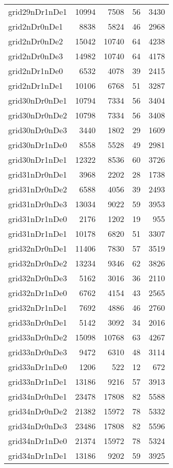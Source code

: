 \begin{longtable}{lrrrr}
grid29nDr1nDe1 & 10994 & 7508 & 56 & 3430 \\
grid2nDr0nDe1 & 8838 & 5824 & 46 & 2968 \\
grid2nDr0nDe2 & 15042 & 10740 & 64 & 4238 \\
grid2nDr0nDe3 & 14982 & 10740 & 64 & 4178 \\
grid2nDr1nDe0 & 6532 & 4078 & 39 & 2415 \\
grid2nDr1nDe1 & 10106 & 6768 & 51 & 3287 \\
grid30nDr0nDe1 & 10794 & 7334 & 56 & 3404 \\
grid30nDr0nDe2 & 10798 & 7334 & 56 & 3408 \\
grid30nDr0nDe3 & 3440 & 1802 & 29 & 1609 \\
grid30nDr1nDe0 & 8558 & 5528 & 49 & 2981 \\
grid30nDr1nDe1 & 12322 & 8536 & 60 & 3726 \\
grid31nDr0nDe1 & 3968 & 2202 & 28 & 1738 \\
grid31nDr0nDe2 & 6588 & 4056 & 39 & 2493 \\
grid31nDr0nDe3 & 13034 & 9022 & 59 & 3953 \\
grid31nDr1nDe0 & 2176 & 1202 & 19 & 955 \\
grid31nDr1nDe1 & 10178 & 6820 & 51 & 3307 \\
grid32nDr0nDe1 & 11406 & 7830 & 57 & 3519 \\
grid32nDr0nDe2 & 13234 & 9346 & 62 & 3826 \\
grid32nDr0nDe3 & 5162 & 3016 & 36 & 2110 \\
grid32nDr1nDe0 & 6762 & 4154 & 43 & 2565 \\
grid32nDr1nDe1 & 7692 & 4886 & 46 & 2760 \\
grid33nDr0nDe1 & 5142 & 3092 & 34 & 2016 \\
grid33nDr0nDe2 & 15098 & 10768 & 63 & 4267 \\
grid33nDr0nDe3 & 9472 & 6310 & 48 & 3114 \\
grid33nDr1nDe0 & 1206 & 522 & 12 & 672 \\
grid33nDr1nDe1 & 13186 & 9216 & 57 & 3913 \\
grid34nDr0nDe1 & 23478 & 17808 & 82 & 5588 \\
grid34nDr0nDe2 & 21382 & 15972 & 78 & 5332 \\
grid34nDr0nDe3 & 23486 & 17808 & 82 & 5596 \\
grid34nDr1nDe0 & 21374 & 15972 & 78 & 5324 \\
grid34nDr1nDe1 & 13186 & 9202 & 59 & 3925 \\

\end{longtable}
